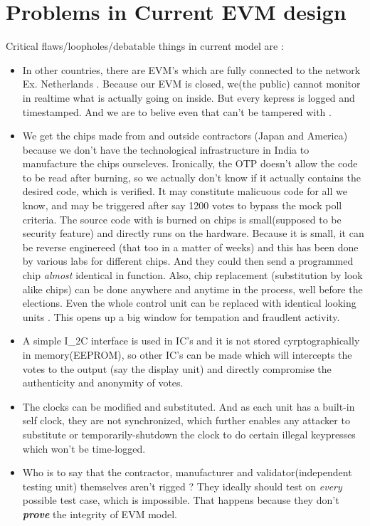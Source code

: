 \documentclass[12pt]{report}
\begin{document}
\section{Problems in Current EVM design} 
Critical flaws/loopholes/debatable things in current model are : 
\begin{itemize}
  \label{sec:standalone}
  \item In other countries, there are EVM's which are fully connected to the network Ex. Netherlands . 
  Because our EVM is closed, we(the public) cannot monitor in realtime what is actually going on inside. But every kepress is logged and timestamped. And we are to belive even that can't be tampered with .

  \label{sec:otp}
  \item We get the chips made from and outside contractors (Japan and America) because we don't have the technological infrastructure in India to manufacture the chips ourseleves.
  Ironically, the OTP doesn't allow the code to be read after burning, so we actually don't know if it actually contains the desired code, which is verified. It may constitute malicuous code for all we know, and may be triggered after say 1200 votes to bypass the mock poll criteria.
  The source code with is burned on chips is small(supposed to be security feature) and directly runs on the hardware. Because it is small, it can be reverse enginereed (that too in a matter of weeks) and this has been done by various labs for different chips. And they could then send a programmed chip \textit{almost} identical in function.
  Also, chip replacement (substitution by look alike chips) can be done anywhere and anytime in the process, well before the elections. Even the whole control unit can be replaced with identical looking units . This opens up a big window for tempation and fraudlent activity.
  \item A simple I_{2}C interface is used in IC's and it is not stored cyrptographically in memory(EEPROM), so other IC's can be made which will intercepts the votes to the output (say the display unit) and directly compromise the authenticity and anonymity of votes.

  \label{sec:clock}
  \item The clocks can be modified and substituted. And as each unit has a built-in self clock, they are not synchronized, which further enables any attacker to substitute or temporarily-shutdown the clock to do certain illegal keypresses which won't be time-logged.

  \label{sec:contract}
  \item Who is to say that the contractor, manufacturer and validator(independent testing unit) themselves aren't rigged ? They ideally should test on \textit{every} possible test case, which is impossible. That happens because they don't \textbf{\textit{prove}} the integrity of EVM model.


\end{itemize}
\end{document}
